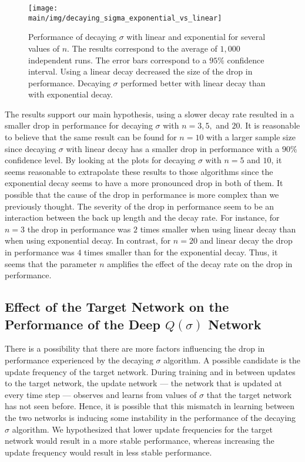 \begin{figure}[t]
    \setlength{\abovecaptionskip}{0pt plus 0pt minus 0pt}
    \centering
    \texttt{[image: \\main/img/decaying\_sigma\_exponential\_vs\_linear]}
    \caption[Performance of Decaying $\sigma$ with Linear and Exponential Decay] {Performance of decaying $\sigma$ with linear and exponential for several values of $n$.
    The results correspond to the average of $1,000$ independent runs.
    The error bars correspond to a $95\%$ confidence interval.
    Using a linear decay decreased the size of the drop in performance.
    Decaying $\sigma$ performed better with linear decay than with exponential decay.
    }
    \label{fig:linear_vs_exponential}
\end{figure}

The results support our main hypothesis, using a slower decay rate resulted in a smaller drop in performance for decaying $\sigma$ with $n = 3, 5,$ and $20$.
It is reasonable to believe that the same result can be found for $n = 10$ with a larger sample size since decaying $\sigma$ with linear decay has a smaller drop in performance with a $90\%$ confidence level.
By looking at the plots for decaying $\sigma$ with $n = 5$ and $10$, it seems reasonable to extrapolate these results to those algorithms since the exponential decay seems to have a more pronounced drop in both of them.
It possible that the cause of the drop in performance is more complex than we previously thought.
The severity of the drop in performance seem to be an interaction between the back up length and the decay rate. 
For instance, for $n = 3$ the drop in performance was $2$ times smaller when using linear decay than when using exponential decay.
In contrast, for $n = 20$ and linear decay the drop in performance was $4$ times smaller than for the exponential decay.
Thus, it seems that the parameter $n$ amplifies the effect of the decay rate on the drop in performance.

\subsection{Effect of the Target Network on the Performance of the Deep $Q(\sigma)$ Network}

There is a possibility that there are more factors influencing the drop in performance experienced by the decaying $\sigma$ algorithm.
A possible candidate is the update frequency of the target network.
During training and in between updates to the target network, the update network --- the network that is updated at every time step --- observes and learns from values of $\sigma$ that the target network has not seen before.
Hence, it is possible that this mismatch in learning between the two networks is inducing some instability in the performance of the decaying $\sigma$ algorithm.
We hypothesized that lower update frequencies for the target network would result in a more stable performance, whereas increasing the update frequency would result in less stable performance.

